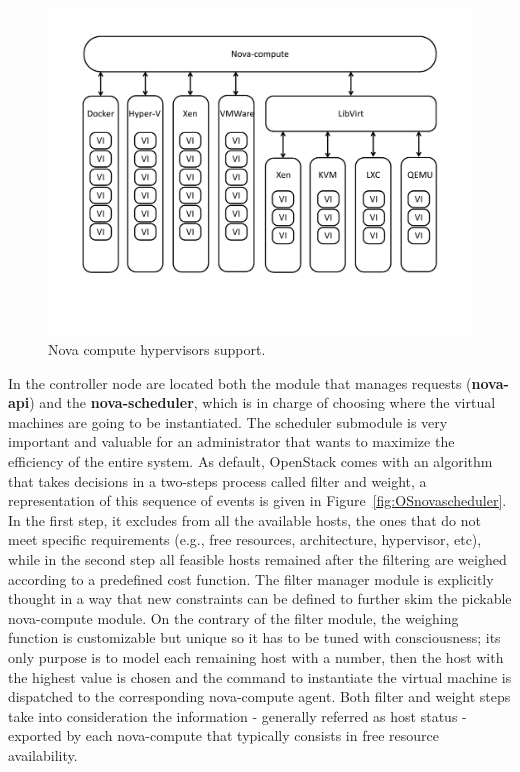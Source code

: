 \begin{figure}[h]
	\centering
	\includegraphics[clip= true, width=0.8 \columnwidth]{images/nova-compute.pdf}
	\caption{Nova compute hypervisors support.}
	\label{fig:OSnovacompute}
\end{figure}
In the controller node are located both the module that manages requests (\textbf{nova-api}) and the \textbf{nova-scheduler}, which is in charge of choosing where the virtual machines are going to be instantiated.
The scheduler submodule is very important and valuable for an administrator that wants to maximize the efficiency of the entire system.
As default, OpenStack comes with an algorithm that takes decisions in a two-steps process called filter and weight, a representation of this sequence of events is given in Figure~\ref{fig:OSnovascheduler}.
In the first step, it excludes from all the available hosts, the ones that do not meet specific requirements (e.g., free resources, architecture, hypervisor, etc), while in the second step all feasible hosts remained after the filtering are weighed according to a predefined cost function. The filter manager module is explicitly thought in a way that new constraints can be defined to further skim the pickable nova-compute module.
On the contrary of the filter module, the weighing function is customizable but unique so it has to be tuned with consciousness; its only purpose is to model each remaining host with a number, then the host with the highest value is chosen and the command to instantiate the virtual machine is dispatched to the corresponding nova-compute agent.
Both filter and weight steps take into consideration the information - generally referred as host status - exported by each nova-compute that typically consists in free resource availability.
